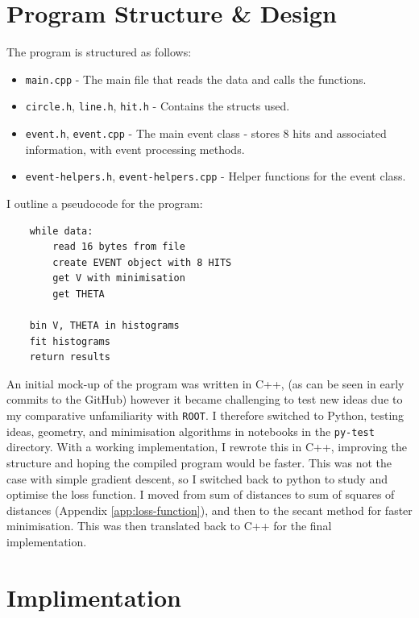 \documentclass[11pt]{article}
\begin{document}
\section{Program Structure \& Design}
\label{sec:program}
The program is structured as follows:
\begin{itemize}
    \item \texttt{main.cpp} - The main file that reads the data and calls the functions.
    \item \texttt{circle.h}, \texttt{line.h}, \texttt{hit.h} - Contains the structs used.
    \item \texttt{event.h}, \texttt{event.cpp} - The main event class - stores 8 hits and associated information, with event processing methods.
    \item \texttt{event-helpers.h}, \texttt{event-helpers.cpp} - Helper functions for the event class.
\end{itemize}


I outline a pseudocode for the program:
\begin{verbatim}
    while data:
        read 16 bytes from file
        create EVENT object with 8 HITS
        get V with minimisation
        get THETA
    
    bin V, THETA in histograms
    fit histograms
    return results
\end{verbatim}
An initial mock-up of the program was written in C++, (as can be seen in early commits to the GitHub) however it became challenging to test new ideas due to my comparative unfamiliarity with \texttt{ROOT}. I therefore switched to Python, testing ideas, geometry, and minimisation algorithms in notebooks in the \texttt{py-test} directory. With a working implementation, I rewrote this in C++, improving the structure and hoping the compiled program would be faster. This was not the case with simple gradient descent, so I switched back to python to study and optimise the loss function. I moved from sum of distances to sum of squares of distances (Appendix \ref{app:loss-function}), and then to the secant method for faster minimisation. This was then translated back to C++ for the final implementation.

\section{Implimentation}
\label{sec:implimentation}
\end{document}
